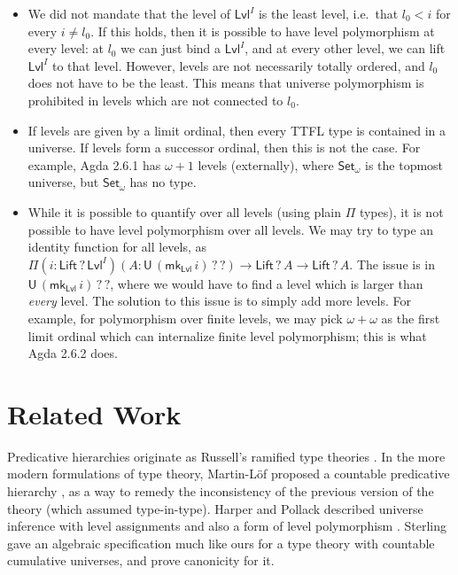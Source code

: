 \documentclass[a4paper,UKenglish,cleveref, autoref, thm-restate]{lipics-v2021}
\theoremstyle{remark}
\theoremstyle{definition}
\newcommand{\Set}[1]{\mathsf{Set_{#1}}}
\newcommand{\U}{\mathsf{U}}
\newcommand{\Lift}{\mathsf{Lift}}
\newcommand{\Lvl}{\mathsf{Lvl}}
\renewcommand{\U}{\mathsf{U}}
\newcommand{\msf}[1]{\mathsf{#1}}
\newcommand{\mkLvl}{\msf{mk}_{\Lvl}}
\begin{document}
\begin{itemize}
\item We did not mandate that the level of $\Lvl^I$ is the least level,
i.e.\ that $l_0 < i$ for every $i \neq l_0$. If this holds, then it is
possible to have level polymorphism at every level: at $l_0$ we can just bind
a $\Lvl^I$, and at every other level, we can lift $\Lvl^I$ to that
level. However, levels are not necessarily totally ordered, and $l_0$ does not
have to be the least. This means that universe polymorphism is prohibited in
levels which are not connected to $l_0$.

\item If levels are given by a limit ordinal, then every TTFL type is contained
in a universe. If levels form a successor ordinal, then this is not the
case. For example, Agda 2.6.1 has $\omega + 1$ levels (externally), where
$\Set{\omega}$ is the topmost universe, but $\Set{\omega}$ has no type.

\item
While it is possible to quantify over all levels (using plain $\Pi$ types), it
is not possible to have level polymorphism over all levels. We may try to type
an identity function for all levels, as $\Pi(i : \Lift\,?\,\Lvl^I)(A :
\U\,(\mkLvl\,i)\,?\,?) \to \Lift\,?\,A \to \Lift\,?\,A$. The issue is in
$\U\,(\mkLvl\,i)\,?\,?$, where we would have to find a level which is larger
than \emph{every} level. The solution to this issue is to simply add more
levels. For example, for polymorphism over finite levels, we may pick $\omega +
\omega$ as the first limit ordinal which can internalize finite level
polymorphism; this is what Agda 2.6.2 does.
\end{itemize}


\section{Related Work} \label{sec:related}

Predicative hierarchies originate as Russell's ramified type theories
\cite{principia}. In the more modern formulations of type theory, Martin-Löf
proposed a countable predicative hierarchy \cite{martinlof73predicative}, as a
way to remedy the inconsistency of the previous version of the theory (which
assumed type-in-type). Harper and Pollack described universe inference with
level assignments and also a form of level polymorphism \cite{harperpollack}.
Sterling \cite{sterling2019algebraic} gave an algebraic specification much like
ours for a type theory with countable cumulative universes, and prove canonicity
for it.
\end{document}
